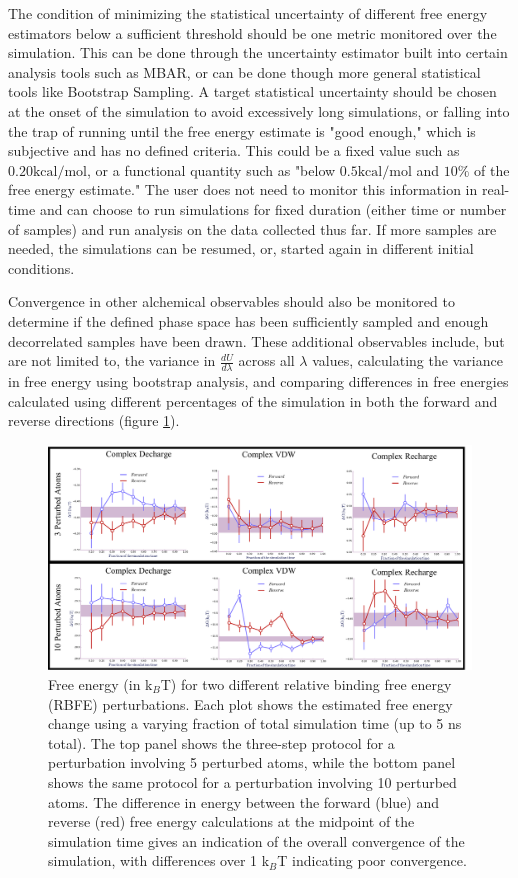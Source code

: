 \documentclass[9pt,bestpractices]{livecoms}
\begin{document}
The condition of minimizing the statistical uncertainty of different free energy estimators below a sufficient threshold should be one metric monitored over the simulation. This can be done through the uncertainty estimator built into certain analysis tools such as MBAR, or can be done though more general statistical tools like Bootstrap Sampling. 
A target statistical uncertainty should be chosen at the onset of the simulation to avoid excessively long simulations, or falling into the trap of running until the free energy estimate is "good enough," which is subjective and has no defined criteria. This could be a fixed value such as $0.20 \mathrm{kcal/mol}$, or a functional quantity such as "below $0.5 \mathrm{kcal/mol}$ and $10\%$ of the free energy estimate." The user does not need to monitor this information in real-time and can choose to run simulations for fixed duration (either time or number of samples) and run analysis on the data collected thus far. If more samples are needed, the simulations can be resumed, or, started again in different initial conditions. 

Convergence in other alchemical observables should also be monitored to determine if the defined phase space has been sufficiently sampled and enough decorrelated samples have been drawn. These additional observables include, but are not
limited to, the variance in $\frac{dU}{d\lambda}$ across all $\lambda$ values, calculating the variance in free energy using bootstrap analysis, and comparing differences in free energies calculated using different percentages of the simulation in both the forward and reverse directions (figure \ref{fig:convergence_forward_reverse}).

\begin{figure}
    \centering
    \includegraphics[width=0.95\linewidth]{paper/figures/fig9_forward_reverse/Forward_Reverse_Fig.pdf}
    \caption{Free energy (in k$_{B}$T) for two different relative binding free energy (RBFE) perturbations. 
    Each plot shows the estimated free energy change using a varying fraction of total simulation time (up to 5 ns total). 
    The top panel shows the three-step protocol for a perturbation involving 5 perturbed atoms, while the bottom panel shows the same protocol for a perturbation involving 10 perturbed atoms. The difference in energy between the forward (blue) and reverse (red) free energy calculations at the midpoint of the simulation time gives an indication of the overall convergence of the simulation, with differences over 1 k$_{B}$T indicating poor convergence.}
    \label{fig:convergence_forward_reverse}
\end{figure}
\end{document}
